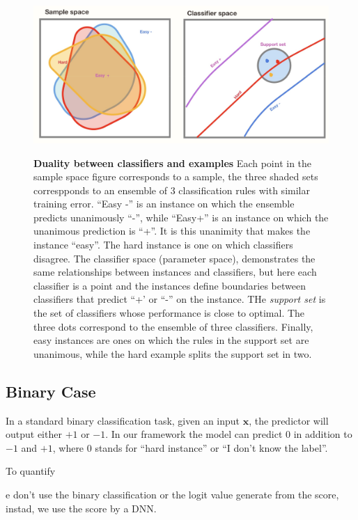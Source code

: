 \documentclass{article}
\begin{document}
\begin{figure}[tbh]
    \includegraphics[width=\textwidth]{figs/SupportSet.jpg}
\label{fig:struc}
\caption{\textbf{Duality between classifiers and examples} Each point
  in the sample space figure corresponds to a sample, the three shaded
  sets correspponds to an ensemble of 3 classification rules with
  similar training error. ``Easy -'' is an instance on which the
  ensemble predicts unanimously ``-'', while ``Easy+'' is an instance
  on which the unanimous prediction is ``+''. It is this unanimity
  that makes the instance ``easy''. The hard instance is one on which
  classifiers disagree.  The classifier space (parameter space),
  demonstrates the same relationships between instances and
  classifiers, but here each classifier is a point and the instances
  define boundaries between classifiers that predict ``+' or ``-'' on
  the instance. THe {\em support set} is the set of classifiers whose
  performance is close to optimal. The three dots correspond to the
  ensemble of three classifiers. Finally, easy instances are ones on
  which the rules in the support set are unanimous, while the hard
  example splits the support set in two. \label{fig:duality}}
\end{figure}


\subsection{Binary Case}
In a standard binary classification task, given an input $\textbf{x}$,
the predictor will output either $+1$ or $-1$. In our framework the
model can predict $0$ in addition to $-1$ and $+1$, where $0$ stands
for ``hard instance'' or ``I don't know the label''.

To quantify


e don't use the binary classification or the logit value generate from the score, instad, we use the score by a DNN.
\end{document}
